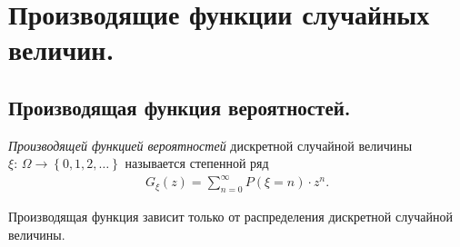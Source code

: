 \documentclass[../main.tex]{subfiles}
\begin{document}
\newpage
\section{Производящие функции случайных величин.}

\subsection{Производящая функция вероятностей.}

\begin{df}
 \textit{Производящей функцией вероятностей} дискретной случайной величины $ \xi\colon\,\Omega\to \left\{ 0,1,2,\ldots \right\} $ называется степенной ряд
 \begin{align*}
  G_\xi(z) = \sum_{n=0}^{\infty}P(\xi = n) \cdot z^{n}.
 \end{align*}
\end{df}

\begin{remrk*}
 Производящая функция зависит только от распределения дискретной случайной величины. 
\end{remrk*}
\end{document}

